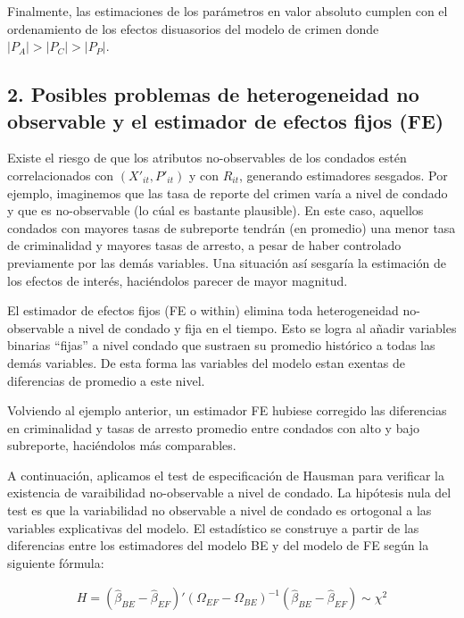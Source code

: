 \documentclass[
]{article}
\begin{document}
Finalmente, las estimaciones de los parámetros en valor absoluto cumplen
con el ordenamiento de los efectos disuasorios del modelo de crimen
donde \(|P_A|>|P_C|>|P_P|\).

\hypertarget{posibles-problemas-de-heterogeneidad-no-observable-y-el-estimador-de-efectos-fijos-fe}{%
\subsection{2. Posibles problemas de heterogeneidad no observable y el
estimador de efectos fijos
(FE)}\label{posibles-problemas-de-heterogeneidad-no-observable-y-el-estimador-de-efectos-fijos-fe}}

Existe el riesgo de que los atributos no-observables de los condados
estén correlacionados con \((X'_{it},P'_{it})\) y con \(R_{it}\),
generando estimadores sesgados. Por ejemplo, imaginemos que las tasa de
reporte del crimen varía a nivel de condado y que es no-observable (lo
cúal es bastante plausible). En este caso, aquellos condados con mayores
tasas de subreporte tendrán (en promedio) una menor tasa de criminalidad
y mayores tasas de arresto, a pesar de haber controlado previamente por
las demás variables. Una situación así sesgaría la estimación de los
efectos de interés, haciéndolos parecer de mayor magnitud.

El estimador de efectos fijos (FE o within) elimina toda heterogeneidad
no-observable a nivel de condado y fija en el tiempo. Esto se logra al
añadir variables binarias ``fijas'' a nivel condado que sustraen su
promedio histórico a todas las demás variables. De esta forma las
variables del modelo estan exentas de diferencias de promedio a este
nivel.

Volviendo al ejemplo anterior, un estimador FE hubiese corregido las
diferencias en criminalidad y tasas de arresto promedio entre condados
con alto y bajo subreporte, haciéndolos más comparables.

A continuación, aplicamos el test de especificación de Hausman para
verificar la existencia de varaibilidad no-observable a nivel de
condado. La hipótesis nula del test es que la variabilidad no observable
a nivel de condado es ortogonal a las variables explicativas del modelo.
El estadístico se construye a partir de las diferencias entre los
estimadores del modelo BE y del modelo de FE según la siguiente fórmula:

\begin{gather*}
H = ( \hat \beta_{BE} - \hat \beta_{EF})' (\Omega_{EF}-\Omega_{BE})^{-1}  ( \hat \beta_{BE} - \hat \beta_{EF}) \sim \chi^2
\end{gather*}
\end{document}
